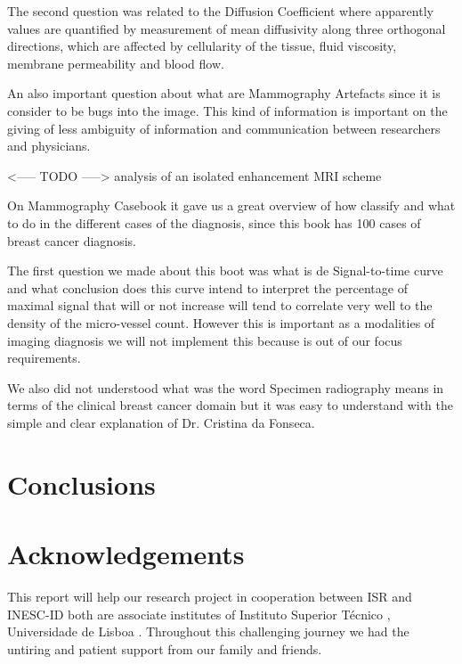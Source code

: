 The second question was related to the Diffusion Coefficient where apparently  values are quantified by measurement of mean diffusivity along three orthogonal directions, which are affected by cellularity of the tissue, fluid viscosity, membrane permeability and blood flow.

An also important question about what are Mammography Artefacts since it is consider to be bugs into the image. This kind of information is important on the giving of less ambiguity of information and communication between researchers and physicians.

<----- TODO -----> analysis of an isolated enhancement MRI scheme

On Mammography Casebook it gave us a great overview of how classify and what to do in the different cases of the diagnosis, since this book has 100 cases of breast cancer diagnosis.

The first question we made about this boot was what is de Signal-to-time curve and what conclusion does this curve intend to interpret the percentage of maximal signal that will or not increase will tend to correlate very well to the density of the micro-vessel count. However this is important as a modalities of imaging diagnosis we will not implement this because is out of our focus requirements.

We also did not understood what was the word Specimen radiography means in terms of the clinical breast cancer domain but it was easy to understand with the simple and clear explanation of Dr. Cristina da Fonseca.




\clearpage

\section{Conclusions}

\section{Acknowledgements}

This report will help our research project in cooperation between ISR \cite{isr} and INESC-ID \cite{inescid} both are associate institutes of Instituto Superior T\'{e}cnico \cite{ist}, Universidade de Lisboa \cite{ul}. Throughout this challenging journey we had the untiring and patient support from our family and friends.

